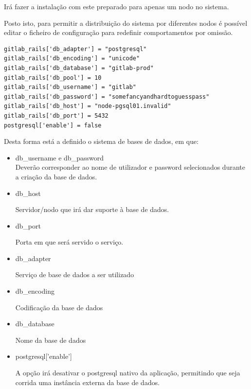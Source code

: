 \documentclass[12pt,a4paper]{article}
\begin{document}
Irá fazer a instalação com este preparado para apenas um nodo no sistema.

Posto isto, para permitir a distribuição do sistema por diferentes nodos é possível editar o ficheiro de configuração para redefinir comportamentos por omissão. 


\begin{verbatim}
gitlab_rails['db_adapter'] = "postgresql"  
gitlab_rails['db_encoding'] = "unicode"  
gitlab_rails['db_database'] = "gitlab-prod"  
gitlab_rails['db_pool'] = 10  
gitlab_rails['db_username'] = "gitlab"  
gitlab_rails['db_password'] = "somefancyandhardtoguesspass"  
gitlab_rails['db_host'] = "node-pgsql01.invalid"  
gitlab_rails['db_port'] = 5432 
postgresql['enable'] = false
\end{verbatim}
Desta forma está a definido o sistema de bases de dados, em que: 
\begin{itemize}
    \item db\_username e db\_password\\
    
Deverão corresponder ao nome de utilizador e password selecionados durante a criação da base de dados.

    \item db\_host
    
Servidor/nodo que irá dar suporte à base de dados.

    \item db\_port
    
Porta em que será servido o serviço.

    \item db\_adapter
    
Serviço de base de dados a ser utilizado

    \item db\_encoding
    
Codificação da base de dados

    \item db\_database

Nome da base de dados

    \item postgresql['enable']

A opção irá desativar o postgresql nativo da aplicação, permitindo que seja corrida uma instância externa da base de dados.

\end{itemize}
\end{document}
